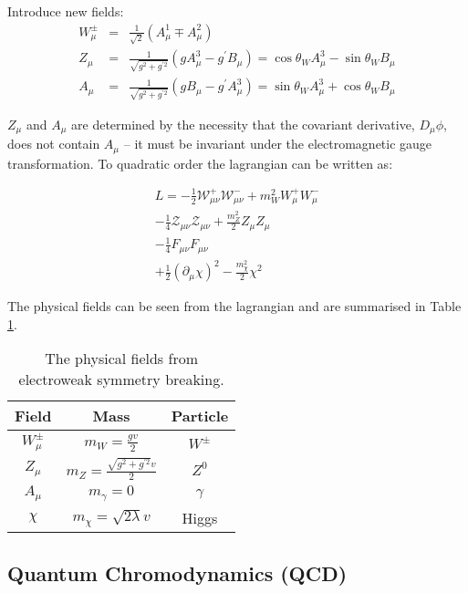 Introduce new fields:
\begin{eqnarray}
W_{\mu}^{\pm} &=& \frac{1}{\sqrt{2}}(A_{\mu}^{1} \mp A_{\mu}^{2}) \\
Z_{\mu} &=& \frac{1}{\sqrt{g^{2} + g^{\prime 2}}}(gA_{\mu}^{3} -
g^{\prime}B_{\mu}) = \cos\theta_{W}A_{\mu}^{3} - \sin\theta_{W}B_{\mu} \\
A_{\mu} &=& \frac{1}{\sqrt{g^{2} + g^{\prime 2}}}(gB_{\mu} -
g^{\prime}A_{\mu}^{3}) = \sin\theta_{W}A_{\mu}^{3} + \cos\theta_{W}B_{\mu}
\end{eqnarray}

$Z_{\mu}$ and $A_{\mu}$ are determined by the necessity that the covariant
derivative, $D_{\mu}\phi$, does not contain $A_{\mu}$ -- it must be invariant
under the electromagnetic gauge transformation. To quadratic order the
lagrangian can be written as:  

\begin{eqnarray}
L = -\frac{1}{2}\mathcal{W}_{\mu\nu}^{+}\mathcal{W}_{\mu\nu}^{-} + 
m_{W}^{2}W_{\mu}^{+}W_{\mu}^{-} \\
-\frac{1}{4}\mathcal{Z}_{\mu\nu}\mathcal{Z}_{\mu\nu} + 
\frac{m_{Z}^{2}}{2}Z_{\mu}Z_{\mu} \\
-\frac{1}{4}F_{\mu\nu}F_{\mu\nu} \\
+\frac{1}{2}(\partial_{\mu}\chi)^{2} - \frac{m_{\chi}^{2}}{2}\chi^{2}
\end{eqnarray}

The physical fields can be seen from the lagrangian and are summarised in Table
\ref{tab:physical}.

\begin{table}
\begin{center}
\begin{tabular}{|c|c|c|}
\hline
Field & Mass & Particle \\
\hline
$W_{\mu}^{\pm}$ & $m_{W} = \frac{gv}{2}$ & $W^{\pm}$ \\
$Z_{\mu}$ & $m_{Z} = \frac{\sqrt{g^{2} + g^{\prime 2}}v}{2}$ & $Z^{0}$ \\
$A_{\mu}$ & $m_{\gamma} = 0$ & $\gamma$ \\
$\chi$ & $m_{\chi} = \sqrt{2\lambda}v$ & Higgs \\
\hline
\end{tabular}
\end{center}
\caption{The physical fields from electroweak symmetry breaking.}
\label{tab:physical}
\end{table} 

\subsection{Quantum Chromodynamics (QCD)}

